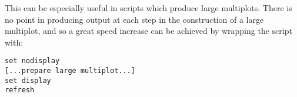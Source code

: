 This can be especially useful in scripts which produce large multiplots. There
is no point in producing output at each step in the construction of a large
multiplot, and so a great speed increase can be achieved by wrapping the script
with:

\begin{verbatim} 
set nodisplay
[...prepare large multiplot...]
set display
refresh
\end{verbatim}

